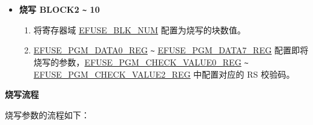 \documentclass[main\_\_CN.tex]{subfiles}
\begin{document}
\begin{itemize}
\begin{enumerate}
    \end{enumerate}
    \item {\bfseries 烧写 BLOCK2 \verb+~+ 10}
    \begin{enumerate}
        \item 将寄存器域 \hyperref[fielddesc:EFUSEBLKNUM]{EFUSE\_BLK\_NUM} 配置为烧写的块数值。
        \item \hyperref[regdesc:EFUSEPGMDATANREG]{EFUSE\_PGM\_DATA0\_REG} \verb+~+ \hyperref[regdesc:EFUSEPGMDATANREG]{EFUSE\_PGM\_DATA7\_REG} 配置即将烧写的参数，\hyperref[regdesc:EFUSEPGMCHECKVALUENREG]{EFUSE\_PGM\_CHECK\_VALUE0\_REG} \verb+~+ \hyperref[regdesc:EFUSEPGMCHECKVALUENREG]{EFUSE\_PGM\_CHECK\_VALUE2\_REG} 中配置对应的 RS 校验码。
    \end{enumerate}
\end{itemize}

{\bfseries 烧写流程}

烧写参数的流程如下：
\end{document}
